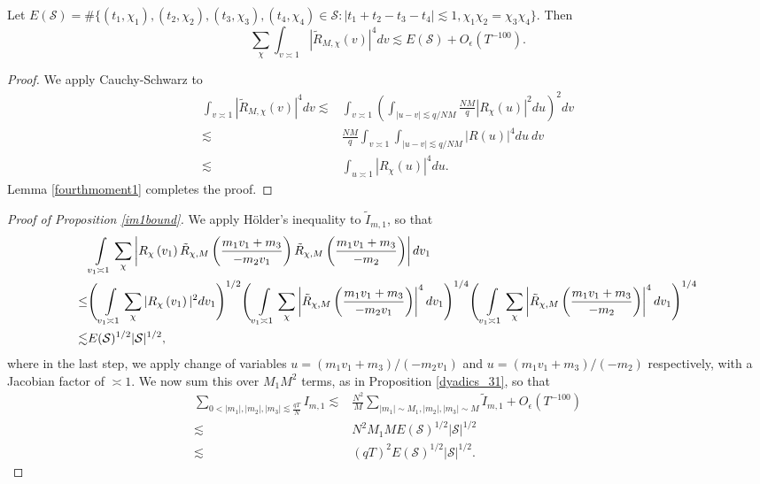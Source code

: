     \begin{lemma}\label{fourthmoment_smooth1}
        Let $E(\mathcal{S})=\#\{(t_1,\chi_1),(t_2,\chi_2),(t_3,\chi_3),(t_4,\chi_4)\in \mathcal{S}  :  |t_1+t_2-t_3-t_4|\lesssim 1, \chi_1\chi_2=\chi_3\chi_4\}$. Then \[
            \sum_{\chi} \int_{v\asymp 1} 
            \left|\tilde{R}_{M,\chi}\left(v\right)\right|^4dv \lesssim E(\mathcal{S}) + O_{\epsilon}(T^{-100}).
        \]
    \end{lemma}
    \begin{proof}
        We apply Cauchy-Schwarz to \begin{align*}
            \int_{v\asymp 1} 
            \left|\tilde{R}_{M,\chi}(v)\right|^4dv  \lesssim& \int_{v\asymp 1} 
            \left(\int_{|u-v|\lesssim q/NM}
            \frac{NM}{q}|R_{\chi}(u)|^2 du\right)^2
            dv \\
            \lesssim& \frac{NM}{q} \int_{v\asymp 1} 
           \int_{|u-v|\lesssim q/NM}
            |R(u)|^4 du \ 
            dv\\
            \lesssim&  
            \int_{u\asymp 1}
             |R_{\chi}(u)|^4 du.
        \end{align*}
        Lemma \ref{fourthmoment1} completes the proof.
    \end{proof}
\begin{proof}[Proof of Proposition \ref{im1bound}]\label{im1boundproof}
    We apply H\"older's inequality to $\tilde{I}_{m,1}$, so that \begin{align*}  
        &\int\displaylimits_{v_1\asymp 1} \sum_{\chi} \left|R_\chi\left(v_1\right) \tilde{R}_{\chi,M}\left(\frac{m_1v_1+m_3}{-m_2v_1}\right)
        \tilde{R}_{\chi,M}\left(\frac{m_1v_1+m_3}{-m_2}\right)\right|dv_1 \\\leq& 
        \Bigg(\int\displaylimits_{v_1\asymp 1} \sum_{\chi} |R_\chi\left(v_1\right)|^2 dv_1 \Bigg)^{1/2}
        \Bigg(\int\displaylimits_{v_1\asymp 1} \sum_{\chi} \left|\tilde{R}_{\chi,M}\left(\frac{m_1v_1+m_3}{-m_2v_1}\right)\right|^4dv_1 \Bigg)^{1/4}
        \Bigg(\int\displaylimits_{v_1\asymp 1} \sum_{\chi}\left| \tilde{R}_{\chi,M}\left(\frac{m_1v_1+m_3}{-m_2}\right)\right|^4dv_1 \Bigg)^{1/4}\\
        \lesssim & E(\mathcal{S})^{1/2}|\mathcal{S}|^{1/2},
    \end{align*}
    where in the last step, we apply change of variables $u=(m_1v_1+m_3)/(-m_2v_1)$ and $u=(m_1v_1+m_3)/(-m_2)$ respectively, with a Jacobian factor of $\asymp 1$.
    We now sum this over $M_1M^2$ terms, as in Proposition \ref{dyadics_31},
    so that \begin{align*}
        \sum_{0<|m_1|,|m_2|,|m_3|\lesssim \frac{qT}{N}} I_{m,1}\lesssim& \frac{N^2}{M}\sum_{|m_1|\sim M_1,|m_2|,|m_3|\sim M}\tilde{I}_{m,1}+O_\epsilon(T^{-100})\\
        \lesssim & N^2M_1ME(\mathcal{S})^{1/2}|\mathcal{S}|^{1/2}\\
        \lesssim & (qT)^2E(\mathcal{S})^{1/2}|\mathcal{S}|^{1/2}.
    \end{align*}
\end{proof}

